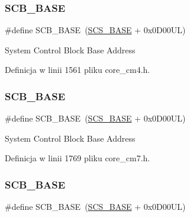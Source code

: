 \subsubsection{\texorpdfstring{S\+C\+B\+\_\+\+B\+A\+SE}{SCB\_BASE}\hspace{0.1cm}{\footnotesize\ttfamily [9/12]}}
{\footnotesize\ttfamily \#define S\+C\+B\+\_\+\+B\+A\+SE~(\hyperlink{group___c_m_s_i_s__core__base_ga3c14ed93192c8d9143322bbf77ebf770}{S\+C\+S\+\_\+\+B\+A\+SE} +  0x0\+D00\+U\+L)}

System Control Block Base Address 

Definicja w linii 1561 pliku core\+\_\+cm4.\+h.

\mbox{\label{group___c_m_s_i_s__core__base_gad55a7ddb8d4b2398b0c1cfec76c0d9fd}} 
\subsubsection{\texorpdfstring{S\+C\+B\+\_\+\+B\+A\+SE}{SCB\_BASE}\hspace{0.1cm}{\footnotesize\ttfamily [10/12]}}
{\footnotesize\ttfamily \#define S\+C\+B\+\_\+\+B\+A\+SE~(\hyperlink{group___c_m_s_i_s__core__base_ga3c14ed93192c8d9143322bbf77ebf770}{S\+C\+S\+\_\+\+B\+A\+SE} +  0x0\+D00\+U\+L)}

System Control Block Base Address 

Definicja w linii 1769 pliku core\+\_\+cm7.\+h.

\mbox{\label{group___c_m_s_i_s__core__base_gad55a7ddb8d4b2398b0c1cfec76c0d9fd}} 
\subsubsection{\texorpdfstring{S\+C\+B\+\_\+\+B\+A\+SE}{SCB\_BASE}\hspace{0.1cm}{\footnotesize\ttfamily [11/12]}}
{\footnotesize\ttfamily \#define S\+C\+B\+\_\+\+B\+A\+SE~(\hyperlink{group___c_m_s_i_s__core__base_ga3c14ed93192c8d9143322bbf77ebf770}{S\+C\+S\+\_\+\+B\+A\+SE} +  0x0\+D00\+U\+L)}

